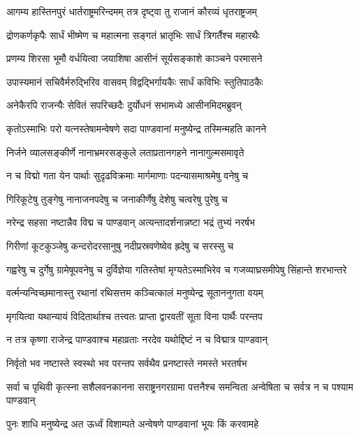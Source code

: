 \twolineshloka
{आगम्य हास्तिनपुरं धार्तराष्ट्रमरिन्दमम्}
{तत्र दृष्ट्वा तु राजानं कौरव्यं धृतराष्ट्रजम्}


\twolineshloka
{द्रोणकर्णकृपैः सार्धं भीष्मेण च महात्मना}
{सङ्गतं भ्रातृभिः सार्धं त्रिगर्तैश्च महारथैः}


\twolineshloka
{प्रणम्य शिरसा भूमौ वर्धयित्वा जयाशिषा}
{आसीनं सूर्यसङ्काशे काञ्चने परमासने}


\twolineshloka
{उपास्यमानं सचिवैर्मरुद्भिरिव वासवम्}
{विद्वद्भिर्गायकैः सार्धं कविभिः स्तुतिपाठकैः}


\twolineshloka
{अनेकैरपि राजन्यैः सेवितं सपरिच्छदैः}
{दुर्योधनं सभामध्ये आसीनमिदमब्रुवन्}


\twolineshloka
{कृतोऽस्माभिः परो यत्नस्तेषामन्वेषणे सदा}
{पाण्डवानां मनुष्येन्द्र तस्मिन्महति कानने}


\twolineshloka
{निर्जने व्यालसङ्कीर्णे नानाभ्रमरसङ्कुले}
{लताप्रतानगहने नानागुल्मसमावृते}


\twolineshloka
{न च विद्मो गता येन पार्थाः सुदृढविक्रमाः}
{मार्गमाणाः पदन्यासमाश्रमेषु वनेषु च}


\twolineshloka
{गिरिकूटेषु तुङ्गेषु नानाजनपदेषु च}
{जनाकीर्णेषु देशेषु चत्वरेषु पुरेषु च}


\twolineshloka
{नरेन्द्र सहसा नष्टान्नैव विद्म च पाण्डवान्}
{अत्यन्तादर्शनान्नष्टा भद्रं तुभ्यं नरर्षभ}


\twolineshloka
{गिरीणां कूटकुञ्जेषु कन्दरोदरसानुषु}
{नदीप्रस्रवणेष्वेव ह्रदेषु च सरस्सु च}


\threelineshloka
{गह्वरेषु च दुर्गेषु ग्रामेषूपवनेषु च}
{दुर्विज्ञेया गतिस्तेषां मृग्यतेऽस्माभिरेव च}
{गजव्याघ्रसमीपेषु सिंहान्ते शरभान्तरे}


\twolineshloka
{वर्त्मन्यन्विच्छमानास्तु रथानां रथिसत्तम}
{कञ्चित्कालं मनुष्येन्द्र सूताननुगता वयम्}


\twolineshloka
{मृगयित्वा यथान्यायं विदितार्थाश्च तत्त्वतः}
{प्राप्ता द्वारवतीं सूता विना पार्थैः परन्तप}


\twolineshloka
{न तत्र कृष्णा राजेन्द्र पाण्डवाश्च महाव्रताः}
{नरदेव यथोद्दिष्टं न च विद्मात्र पाण्डवान्}


\twolineshloka
{निर्वृतो भव नष्टास्ते स्वस्थो भव परन्तप}
{सर्वथैव प्रनष्टास्ते नमस्ते भरतर्षभ}


\threelineshloka
{सर्वा च पृथिवी कृत्स्ना सशैलवनकानना}
{सराष्ट्रनगरग्रामा पत्तनैश्च समन्विता}
{अन्वेषिता च सर्वत्र न च पश्याम पाण्डवान्}


\twolineshloka
{पुनः शाधि मनुष्येन्द्र अत ऊर्ध्वं विशाम्पते}
{अन्वेषणे पाण्डवानां भूयः किं करवामहे}


